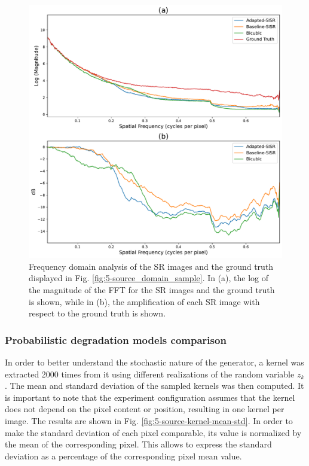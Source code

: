         \begin{figure}[H]
            \centering
            \includegraphics[scale=0.5]{Includes/5-source-sr-fft-comparison.pdf}
            \caption{Frequency domain analysis of the SR images and the ground truth displayed in Fig. \ref{fig:5-source_domain_sample}.
                     In (a), the log of the magnitude of the FFT for the SR images and the ground truth is shown,
                     while in (b), the amplification of each SR image with respect to the ground truth is shown.}
            \label{fig:5-source-sr-fft-comparison}
        \end{figure}

        \subsubsection{Probabilistic degradation models comparison}

        In order to better understand the stochastic nature of the generator, a kernel was extracted 2000 times from it using different realizations of the random variable $z_k$.
        The mean and standard deviation of the sampled kernels was then computed.
        It is important to note that the experiment configuration assumes that the kernel does not depend on the pixel content or position, resulting in one kernel per image.
        The results are shown in Fig. \ref{fig:5-source-kernel-mean-std}. 
        In order to make the standard deviation of each pixel comparable, its value is normalized by the mean of the corresponding pixel. 
        This allows to express the standard deviation as a percentage of the corresponding pixel  mean value.
        
